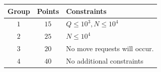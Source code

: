 
\begin{center}
\begin{tabular}{| c | c | l |}
  \hline
  \textbf{Group} & \textbf{Points} & \textbf{Constraints} \\ \hline
  $1$    & $15$  & $Q \le 10^3, N \le 10^4$ \\ \hline
  $2$    & $25$  & $N \le 10^4$ \\ \hline
  $3$    & $20$  & No move requests will occur. \\ \hline
  $4$    & $40$  & No additional constraints \\ \hline
\end{tabular}
\end{center}
